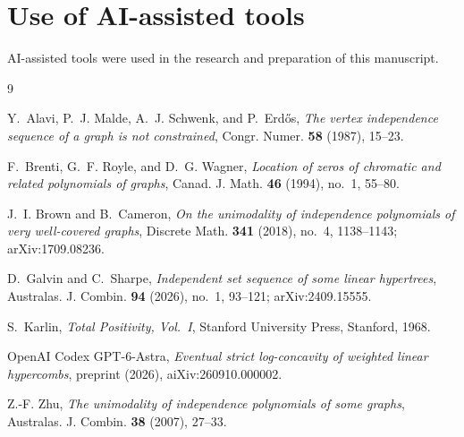 \documentclass{amsart}
\theoremstyle{remark}
\numberwithin{equation}{section}
\begin{document}
\section*{Use of AI-assisted tools}
AI-assisted tools were used in the research and preparation of this
manuscript.

\begin{thebibliography}{9}

Y.~Alavi, P.~J. Malde, A.~J. Schwenk, and P.~Erd\H{o}s, \emph{The vertex
independence sequence of a graph is not constrained}, Congr. Numer.
\textbf{58} (1987), 15--23.

F.~Brenti, G.~F. Royle, and D.~G. Wagner, \emph{Location of zeros of
chromatic and related polynomials of graphs}, Canad. J. Math. \textbf{46}
(1994), no.~1, 55--80.

J.~I. Brown and B.~Cameron, \emph{On the unimodality of independence
polynomials of very well-covered graphs}, Discrete Math. \textbf{341}
(2018), no.~4, 1138--1143; arXiv:1709.08236.

D.~Galvin and C.~Sharpe, \emph{Independent set sequence of some linear
hypertrees}, Australas. J. Combin. \textbf{94} (2026), no.~1, 93--121;
arXiv:2409.15555.

S.~Karlin, \emph{Total Positivity, Vol.~I}, Stanford University Press,
Stanford, 1968.

OpenAI Codex GPT-6-Astra, \emph{Eventual strict log-concavity of weighted
linear hypercombs}, preprint (2026), aiXiv:260910.000002.

Z.-F. Zhu, \emph{The unimodality of independence polynomials of some
graphs}, Australas. J. Combin. \textbf{38} (2007), 27--33.

\end{thebibliography}
\end{document}
